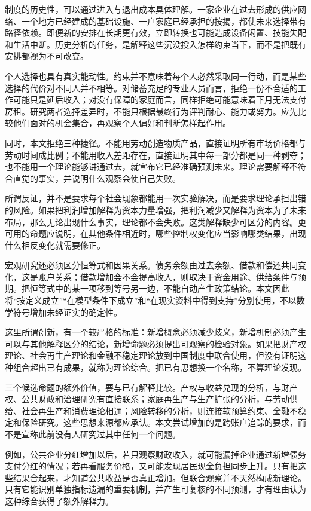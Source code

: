 \documentclass[UTF8,fontset=fandol,zihao=-4,oneside,openany]{ctexbook}
\begin{document}
\label{arg:P012}
制度的历史性，可以通过进入与退出成本具体理解。一家企业在过去形成的供应网络、一个地方已经建成的基础设施、一户家庭已经承担的按揭，都使未来选择带有路径依赖。即便新的安排在长期更有效，立即转换也可能造成设备闲置、技能失配和生活中断。历史分析的任务，是解释这些沉没投入怎样约束当下，而不是把既有安排都视为不可改变。

个人选择也具有真实能动性。约束并不意味着每个人必然采取同一行动，而是某些选择的代价对不同人并不相等。对储蓄充足的专业人员而言，拒绝一份不合适的工作可能只是延后收入；对没有保障的家庭而言，同样拒绝可能意味着下月无法支付房租。研究两者选择差异时，不能只根据最终行为评判耐心、能力或努力。应先比较他们面对的机会集合，再观察个人偏好和判断怎样起作用。

同时，本文拒绝三种捷径。不能用劳动创造物质产品，直接证明所有市场价格都与劳动时间成比例；不能用收入差距存在，直接证明其中每一部分都是同一种剥夺；也不能用一个理论能够讲通过去，就宣布它已经准确预测未来。理论需要解释不符合直觉的事实，并说明什么观察会使自己失败。

\label{arg:P013}
所谓反证，并不是要求每个社会现象都能用一次实验解决，而是要求理论承担出错的风险。如果把利润增加解释为资本力量增强，把利润减少又解释为资本为了未来布局，那么无论出现什么事实，理论都不会失败。这类解释缺少可区分的内容。更可用的命题应说明，在其他条件相近时，哪些控制权变化应当影响哪类结果，出现什么相反变化就需要修正。

宏观研究还必须区分恒等式和因果关系。债务余额由过去余额、借款和偿还共同变化，这是账户关系；借款增加会不会提高收入，则取决于资金用途、供给条件与预期。把恒等式中的某一项移到等号另一边，不能自动产生政策结论。本文因此将“按定义成立”“在模型条件下成立”和“在现实资料中得到支持”分别使用，不以数学符号增加未经证实的确定性。

这里所谓创新，有一个较严格的标准：新增概念必须减少歧义，新增机制必须产生可以与其他解释区分的结论，新增命题必须提出可观察的检验对象。如果把财产权理论、社会再生产理论和金融不稳定理论放到中国制度中联合使用，但没有证明这种组合超出已有成果，就称为理论综合。把已有思想换一个名称，不算理论发现。

\label{arg:P014}
三个候选命题的额外价值，要与已有解释比较。产权与收益兑现的分析，与财产权、公共财政和治理研究有直接联系；家庭再生产与生产扩张的分析，与劳动供给、社会再生产和消费理论相通；风险转移的分析，则连接软预算约束、金融不稳定和保险研究。这些思想来源都应承认。本文尝试增加的是跨账户追踪的要求，而不是宣称此前没有人研究过其中任何一个问题。

例如，公共企业分红增加以后，若只观察财政收入，就可能漏掉企业通过新增债务支付分红的情况；若再看服务价格，又可能发现居民现金负担同步上升。只有把这些结果合起来，才知道公共收益是否真正增加。但联合观察并不天然构成新理论。只有它能识别单独指标遗漏的重要机制，并产生可复核的不同预测，才有理由认为这种综合获得了额外解释力。
\end{document}
